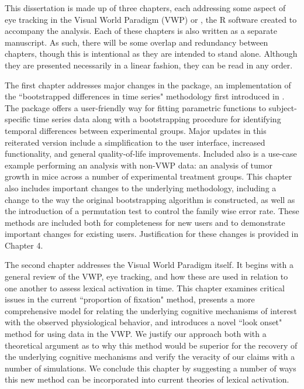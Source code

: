 

This dissertation is made up of three chapters, each addressing some aspect of eye tracking in the Visual World Paradigm (VWP) or , the R software created to accompany the analysis. Each of these chapters is also written as a separate manuscript. As such, there will be some overlap and redundancy between chapters, though this is intentional as they are intended to stand alone. Although they are presented necessarily in a linear fashion, they can be read in any order.

The first chapter addresses major changes in the  package, an implementation of the ``bootstrapped differences in time series" methodology first introduced in \citet{oleson2017detecting}. The package offers a user-friendly way for fitting parametric functions to subject-specific time series data along with a bootstrapping procedure for identifying temporal differences between experimental groups. Major updates in this reiterated version include a simplification to the user interface, increased functionality, and general quality-of-life improvements. Included also is a use-case example performing an analysis with non-VWP data: an analysis of tumor growth in mice across a number of experimental treatment groups. This chapter also includes important changes to the underlying methodology, including a change to the way the original bootstrapping algorithm is constructed, as well as the introduction of a permutation test to control the family wise error rate. These methods are included both for completeness for new users and to demonstrate important changes for existing users. Justification for these changes is provided in Chapter 4. 

The second chapter addresses the Visual World Paradigm itself. It begins with a general review of the VWP, eye tracking, and how these are used in relation to one another to assess lexical activation in time. This chapter examines critical issues in the current ``proportion of fixation" method, presents a more comprehensive model for relating the underlying cognitive mechanisms of interest with the observed physiological behavior, and introduces a novel ``look onset" method for using data in the VWP. We justify our approach both with a theoretical argument as to why this method would be superior for the recovery of the underlying cognitive mechanisms and verify the veracity of our claims with a number of simulations. We conclude this chapter by suggesting a number of ways this new method can be incorporated into current theories of lexical activation.

